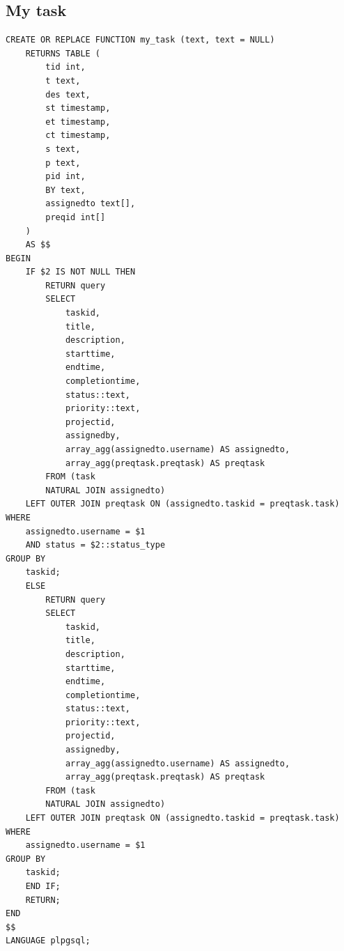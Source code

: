 \documentclass[conference,onecolumn]{IEEEtran}
\begin{document}
\subsection{My task}
\begin{verbatim}
CREATE OR REPLACE FUNCTION my_task (text, text = NULL)
    RETURNS TABLE (
        tid int,
        t text,
        des text,
        st timestamp,
        et timestamp,
        ct timestamp,
        s text,
        p text,
        pid int,
        BY text,
        assignedto text[],
        preqid int[]
    )
    AS $$
BEGIN
    IF $2 IS NOT NULL THEN
        RETURN query
        SELECT
            taskid,
            title,
            description,
            starttime,
            endtime,
            completiontime,
            status::text,
            priority::text,
            projectid,
            assignedby,
            array_agg(assignedto.username) AS assignedto,
            array_agg(preqtask.preqtask) AS preqtask
        FROM (task
        NATURAL JOIN assignedto)
    LEFT OUTER JOIN preqtask ON (assignedto.taskid = preqtask.task)
WHERE
    assignedto.username = $1
    AND status = $2::status_type
GROUP BY
    taskid;
    ELSE
        RETURN query
        SELECT
            taskid,
            title,
            description,
            starttime,
            endtime,
            completiontime,
            status::text,
            priority::text,
            projectid,
            assignedby,
            array_agg(assignedto.username) AS assignedto,
            array_agg(preqtask.preqtask) AS preqtask
        FROM (task
        NATURAL JOIN assignedto)
    LEFT OUTER JOIN preqtask ON (assignedto.taskid = preqtask.task)
WHERE
    assignedto.username = $1
GROUP BY
    taskid;
    END IF;
    RETURN;
END
$$
LANGUAGE plpgsql;
\end{verbatim}
\end{document}

